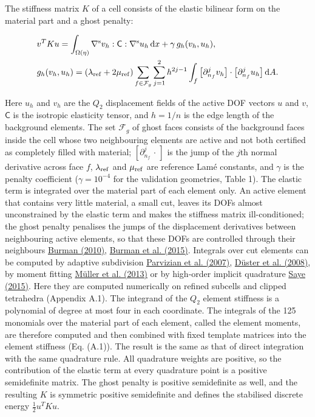 \documentclass[preprint,12pt,authoryear]{elsarticle}
\begin{document}
The stiffness matrix \(K\) of a cell consists of the elastic bilinear form on the material part and a ghost penalty:

\[
\begin{aligned}
&v^TKu=\int_{\Omega(\eta)}\nabla^{\rm s}v_h:\mathsf C:\nabla^{\rm s}u_h\,\mathrm dx+\gamma\,g_h(v_h,u_h),\\
&g_h(v_h,u_h)=(\lambda_{\rm ref}+2\mu_{\rm ref})\sum_{f\in\mathcal F_g}\sum_{j=1}^{2}h^{2j-1}\int_f\big[\partial_{n_f}^{j}v_h\big]\cdot\big[\partial_{n_f}^{j}u_h\big]\,\mathrm dA.
\end{aligned}
\]

Here \(u_h\) and \(v_h\) are the \(Q_2\) displacement fields of the active DOF vectors \(u\) and \(v\), \(\mathsf C\) is the isotropic elasticity tensor, and \(h=1/n\) is the edge length of the background elements. The set \(\mathcal F_g\) of ghost faces consists of the background faces inside the cell whose two neighbouring elements are active and not both certified as completely filled with material; \([\partial_{n_f}^{j}\,\cdot\,]\) is the jump of the \(j\)th normal derivative across face \(f\), \(\lambda_{\rm ref}\) and \(\mu_{\rm ref}\) are reference Lamé constants, and \(\gamma\) is the penalty coefficient (\(\gamma=10^{-4}\) for the validation geometries, Table 1). The elastic term is integrated over the material part of each element only. An active element that contains very little material, a small cut, leaves its DOFs almost unconstrained by the elastic term and makes the stiffness matrix ill-conditioned; the ghost penalty penalises the jumps of the displacement derivatives between neighbouring active elements, so that these DOFs are controlled through their neighbours \href{https://doi.org/10.1016/j.crma.2010.10.006}{Burman (2010)}, \href{https://doi.org/10.1002/nme.4823}{Burman et al. (2015)}. Integrals over cut elements can be computed by adaptive subdivision \href{https://doi.org/10.1007/s00466-007-0173-y}{Parvizian et al. (2007)}, \href{https://doi.org/10.1016/j.cma.2008.02.036}{Düster et al. (2008)}, by moment fitting \href{https://doi.org/10.1002/nme.4569}{Müller et al. (2013)} or by high-order implicit quadrature \href{https://doi.org/10.1137/140966290}{Saye (2015)}. Here they are computed numerically on refined subcells and clipped tetrahedra (Appendix A.1). The integrand of the \(Q_2\) element stiffness is a polynomial of degree at most four in each coordinate. The integrals of the 125 monomials over the material part of each element, called the element moments, are therefore computed and then combined with fixed template matrices into the element stiffness (Eq. (A.1)). The result is the same as that of direct integration with the same quadrature rule. All quadrature weights are positive, so the contribution of the elastic term at every quadrature point is a positive semidefinite matrix. The ghost penalty is positive semidefinite as well, and the resulting \(K\) is symmetric positive semidefinite and defines the stabilised discrete energy \(\tfrac12u^TKu\).
\end{document}
